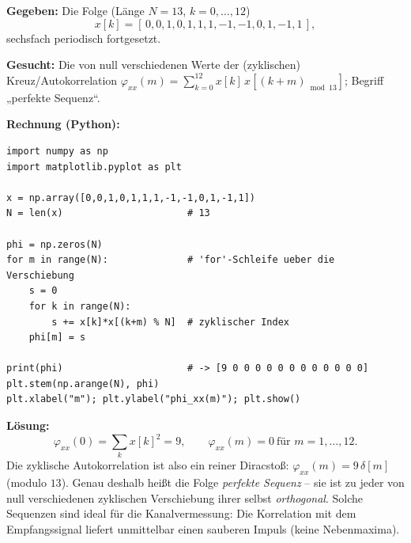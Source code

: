 \begin{beispiel}

\textbf{Gegeben:} Die Folge (Länge $N=13$, $k=0,\ldots,12$)
$$
x[k] = [\,0,0,1,0,1,1,1,-1,-1,0,1,-1,1\,],
$$
sechsfach periodisch fortgesetzt.

\textbf{Gesucht:} Die von null verschiedenen Werte der (zyklischen)
Kreuz\-/Autokorrelation
$\varphi_{xx}(m)=\sum_{k=0}^{12} x[k]\,x[(k+m)_{\bmod 13}]$; Begriff „perfekte
Sequenz``.

\textbf{Rechnung (Python):}
\begin{lstlisting}[style=python]
import numpy as np
import matplotlib.pyplot as plt

x = np.array([0,0,1,0,1,1,1,-1,-1,0,1,-1,1])
N = len(x)                      # 13

phi = np.zeros(N)
for m in range(N):              # 'for'-Schleife ueber die Verschiebung
    s = 0
    for k in range(N):
        s += x[k]*x[(k+m) % N]  # zyklischer Index
    phi[m] = s

print(phi)                      # -> [9 0 0 0 0 0 0 0 0 0 0 0 0]
plt.stem(np.arange(N), phi)
plt.xlabel("m"); plt.ylabel("phi_xx(m)"); plt.show()
\end{lstlisting}

\textbf{Lösung:}
$$
\boxed{\;\varphi_{xx}(0) = \sum_k x[k]^2 = 9,\qquad \varphi_{xx}(m) = 0\ \text{für } m=1,\ldots,12.\;}
$$
Die zyklische Autokorrelation ist also ein reiner Diracstoß:
$\varphi_{xx}(m)=9\,\delta[m]$ (modulo $13$). Genau deshalb heißt die Folge
\emph{perfekte Sequenz} -- sie ist zu jeder von null verschiedenen zyklischen
Verschiebung ihrer selbst \emph{orthogonal}. Solche Sequenzen sind ideal für die
Kanalvermessung: Die Korrelation mit dem Empfangssignal liefert unmittelbar
einen sauberen Impuls (keine Nebenmaxima).
\end{beispiel}
